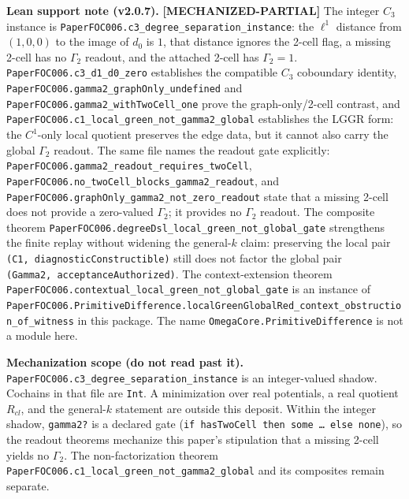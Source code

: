 \documentclass[
]{article}
\renewenvironment{quote}
  {\begin{leftbar}\small}
  {\end{leftbar}}
\begin{document}
\textbf{Lean support note (v2.0.7).} \textbf{{[}MECHANIZED-PARTIAL{]}} The integer \(C_3\) instance is \texttt{PaperFOC006.c3\_degree\_separation\_instance}: the \(\ell^1\) distance from \((1,0,0)\) to the image of \(d_0\) is \(1\), that distance ignores the 2-cell flag, a missing 2-cell has no \(\Gamma_2\) readout, and the attached 2-cell has \(\Gamma_2=1\). \texttt{PaperFOC006.c3\_d1\_d0\_zero} establishes the compatible \(C_3\) coboundary identity, \texttt{PaperFOC006.gamma2\_graphOnly\_undefined} and \texttt{PaperFOC006.gamma2\_withTwoCell\_one} prove the graph-only/2-cell contrast, and \texttt{PaperFOC006.c1\_local\_green\_not\_gamma2\_global} establishes the LGGR form: the \(C^1\)-only local quotient preserves the edge data, but it cannot also carry the global \(\Gamma_2\) readout. The same file names the readout gate explicitly: \texttt{PaperFOC006.gamma2\_readout\_requires\_twoCell}, \texttt{PaperFOC006.no\_twoCell\_blocks\_gamma2\_readout}, and \texttt{PaperFOC006.graphOnly\_gamma2\_not\_zero\_readout} state that a missing 2-cell does not provide a zero-valued \(\Gamma_2\); it provides no \(\Gamma_2\) readout. The composite theorem \texttt{PaperFOC006.degreeDsl\_local\_green\_not\_global\_gate} strengthens the finite replay without widening the general-\(k\) claim: preserving the local pair \texttt{(C1,\ diagnosticConstructible)} still does not factor the global pair \texttt{(Gamma2,\ acceptanceAuthorized)}. The context-extension theorem \texttt{PaperFOC006.contextual\_local\_green\_not\_global\_gate} is an instance of \texttt{PaperFOC006.PrimitiveDifference.localGreenGlobalRed\_context\_obstruction\_of\_witness} in this package. The name \texttt{OmegaCore.PrimitiveDifference} is not a module here.

\begin{quote}
\textbf{Mechanization scope (do not read past it).} \texttt{PaperFOC006.c3\_degree\_separation\_instance} is an integer-valued shadow. Cochains in that file are \texttt{Int}. A minimization over real potentials, a real quotient \(R_{cl}\), and the general-\(k\) statement are outside this deposit. Within the integer shadow, \texttt{gamma2?} is a declared gate (\texttt{if\ hasTwoCell\ then\ some\ …\ else\ none}), so the readout theorems mechanize this paper's stipulation that a missing 2-cell yields no \(\Gamma_2\). The non-factorization theorem \texttt{PaperFOC006.c1\_local\_green\_not\_gamma2\_global} and its composites remain separate.
\end{quote}
\end{document}
